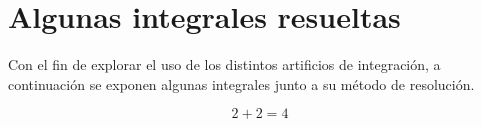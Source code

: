 \section{Algunas integrales resueltas}
Con el fin de explorar el uso de los distintos artificios de integración, a continuación se exponen algunas integrales junto a su método de resolución.

$$2+2=4$$

